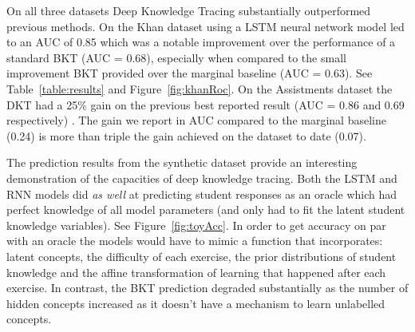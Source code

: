 On all three datasets Deep Knowledge Tracing substantially outperformed previous methods. On the Khan dataset using a LSTM neural network model led to an AUC of 0.85 which was a notable improvement over the performance of a standard BKT (AUC = 0.68), especially when compared to the small improvement BKT provided over the marginal baseline (AUC = 0.63). See Table~\ref{table:results} and Figure~\ref{fig:khanRoc}. On the Assistments dataset the DKT had a 25\% gain on the previous best reported result (AUC = 0.86 and 0.69 respectively) \cite{pardos2011kt}. The gain we report in AUC compared to the marginal baseline (0.24) is more than triple the gain achieved on the dataset to date (0.07).

The prediction results from the synthetic dataset provide an interesting demonstration of the capacities of deep knowledge tracing. Both the LSTM and RNN models did \emph{as well} at predicting student responses as an oracle which had perfect knowledge of all model parameters (and only had to fit the latent student knowledge variables). See Figure~\ref{fig:toyAcc}. In order to get accuracy on par with an oracle the models would have to mimic a function that incorporates: latent concepts, the difficulty of each exercise, the prior distributions of student knowledge and the affine transformation of learning that happened after each exercise. In contrast, the BKT prediction degraded substantially as the number of hidden concepts increased as it doesn't have a mechanism to learn unlabelled concepts.


